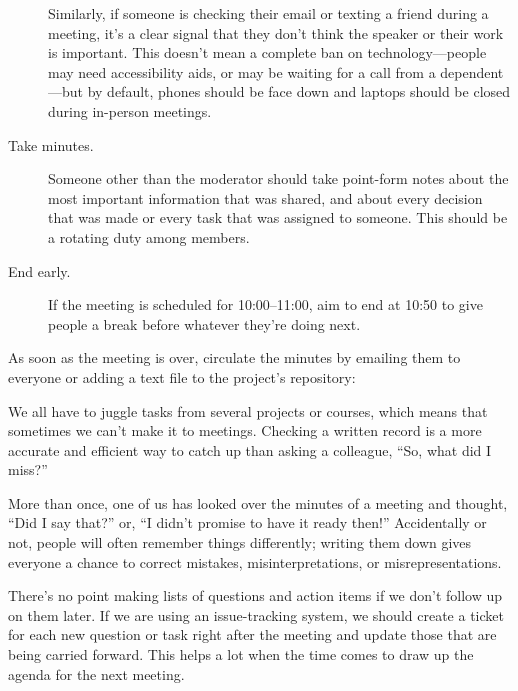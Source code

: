 \documentclass[
]{krantz}
\providecommand{\tightlist}{%
  \setlength{\itemsep}{0pt}\setlength{\parskip}{0pt}}
\begin{document}
\begin{description}
Similarly,
if someone is checking their email or texting a friend during a meeting,
it's a clear signal that they don't think the speaker or their work is important.
This doesn't mean a complete ban on technology---people may need accessibility aids,
or may be waiting for a call from a dependent---but by default,
phones should be face down and laptops should be closed
during in-person meetings.
\item[Take minutes.]
Someone other than the moderator should take point-form notes
about the most important information that was shared,
and about every decision that was made or every task that was assigned to someone.
This should be a rotating duty among members.
\item[End early.]
If the meeting is scheduled for 10:00--11:00,
aim to end at 10:50 to give people a break before whatever they're doing next.
\end{description}

As soon as the meeting is over,
circulate the minutes by emailing them to everyone
or adding a text file to the project's repository:

\begin{description}
\tightlist
\item[People who weren't at the meeting can keep track of what's going on.]
We all have to juggle tasks from several projects or courses,
which means that sometimes we can't make it to meetings.
Checking a written record
is a more accurate and efficient way to catch up than asking a colleague,
``So, what did I miss?''
\item[Everyone can check what was actually said or promised.]
More than once,
one of us has looked over the minutes of a meeting and thought,
``Did I say that?'' or,
``I didn't promise to have it ready then!''
Accidentally or not,
people will often remember things differently;
writing them down gives everyone a chance to correct mistakes,
misinterpretations,
or misrepresentations.
\item[People can be held accountable at subsequent meetings.]
There's no point making lists of questions and action items
if we don't follow up on them later.
If we are using an issue-tracking system,
we should create a ticket for each new question or task right after the meeting
and update those that are being carried forward.
This helps a lot when the time comes to draw up the agenda for the next meeting.
\end{description}
\end{document}
